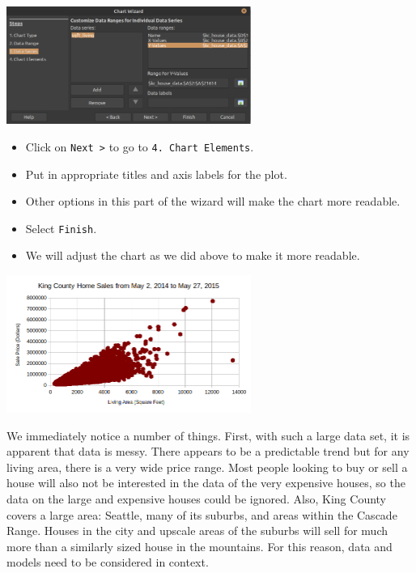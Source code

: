   \begin{center}
  \includegraphics[width = 0.6\textwidth]{img/chap1/sec1-3/scatterplot-column-3.png}
  \end{center}
    \begin{itemize}
      \item Click on {\tt Next >} to go to {\tt 4.\ Chart Elements}.
      \item Put in appropriate titles and axis labels for the plot.
      \item Other options in this part of the wizard will make the chart more readable.
      \item Select {\tt Finish}.
      \item We will adjust the chart as we did above to make it more readable.
    \end{itemize}
    \begin{center}
    \includegraphics[width = 0.6\textwidth]{img/chap1/sec1-3/fig1-3-houseprices.png}
    \end{center}

We immediately notice a number of things. First, with such a large data set, it is apparent that data is messy. There appears to be a predictable trend but for any living area, there is a very wide price range. Most people looking to buy or sell a house will also not be interested in the data of the very expensive houses, so the data on the large and expensive houses could be ignored. Also, King County covers a large area: Seattle, many of its suburbs, and areas within the Cascade Range. Houses in the city and upscale areas of the suburbs will sell for much more than a similarly sized house in the mountains. For this reason, data and models need to be considered in context.

